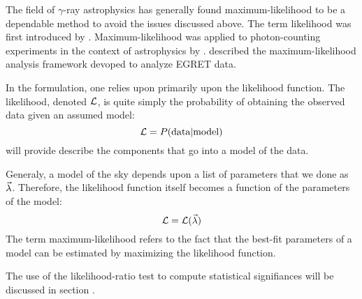 
The field of $\gamma$-ray astrophysics has generally found
maximum-likelihood to be a dependable method to avoid the issues
discussed above.  The term likelihood was first introduced by
\cite{likelihood_fisher_1925}.  Maximum-likelihood was applied
to photon-counting experiments in the context of astrophysics by
\cite{likelihood_cash_1979}.  \cite{likelihood_egret_mattox_1996}
described the maximum-likelihood analysis framework devoped to analyze
EGRET data.

In the formulation, one relies upon primarily upon the likelihood
function.  The likelihood, denoted $\mathcal{L}$, is quite simply the
probability of obtaining the observed data given an assumed model:
\begin{equation}
  \mathcal{L} = P(\text{data}|\text{model})
\end{equation}
 will provide describe the
components that go into a model of the data.

Generaly, a model of the sky depends upon a list
of parameters that we done as $\vec\lambda$.
Therefore, the likelihood function itself becomes
a function of the parameters of the model:
\begin{equation}
  \mathcal{L} = \mathcal{L}(\vec\lambda)
\end{equation}
The term maximum-likelihood refers to the fact that
the best-fit parameters of a model can be estimated
by maximizing the likelihood function.



The use of the likelihood-ratio test to compute statistical
signifiances will be discussed in section .

